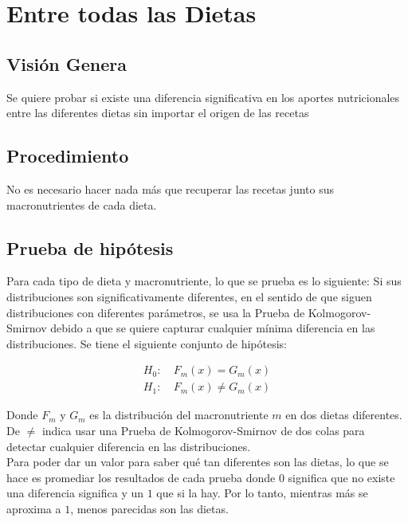 \documentclass[12pt,a4paper]{article}
\begin{document}
    \newpage


    \section{Entre todas las Dietas}
    {
        \subsection{Visión Genera}
        {
            Se quiere probar si existe una diferencia significativa en 
            los aportes nutricionales entre las diferentes dietas sin 
            importar el origen de las recetas
        }

        \subsection{Procedimiento}
        {
            No es necesario hacer nada más que recuperar las recetas junto 
            sus macronutrientes de cada dieta.
        }

        \subsection{Prueba de hipótesis}
        {
            Para cada tipo de dieta y macronutriente, lo que se prueba es 
            lo siguiente: Si sus distribuciones son significativamente 
            diferentes, en el sentido de que siguen distribuciones con diferentes 
            parámetros, se usa la Prueba de Kolmogorov-Smirnov debido a que se quiere 
            capturar cualquier mínima diferencia en las distribuciones. Se tiene el 
            siguiente conjunto de hipótesis:

            \begin{align*}
                H_0 :&\ F_m(x) = G_m(x) \\ 
                H_1 :&\ F_m(x) \ne G_m(x)
            \end{align*}

            Donde $F_m$ y $G_m$ es la distribución del macronutriente $m$ en dos 
            dietas diferentes. De $\ne$ indica usar una Prueba de Kolmogorov-Smirnov 
            de dos colas para detectar cualquier diferencia en las distribuciones.\\

            Para poder dar un valor para saber qué tan diferentes son las dietas, lo que se 
            hace es promediar los resultados de cada prueba donde $0$ significa que no existe 
            una diferencia significa y un $1$ que si la hay. Por lo tanto, mientras más se 
            aproxima a $1$, menos parecidas son las dietas.

        }
    }

    \newpage
\end{document}
